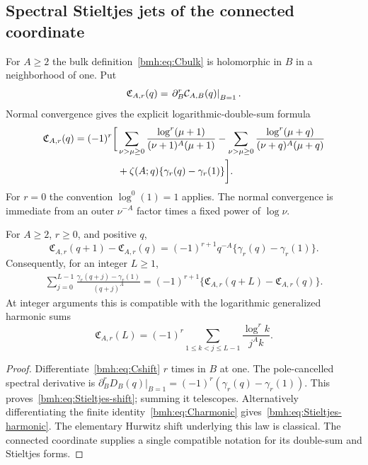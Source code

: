 \subsection{Spectral Stieltjes jets of the connected coordinate}
For $A\ge2$ the bulk definition~\eqref{bmh:eq:Cbulk} is holomorphic in
$B$ in a neighborhood of one. Put
\begin{equation}\label{bmh:eq:scriptC}
 \mathfrak C_{A,r}(q)=
 \left.\partial_B^r\mathcal C_{A,B}(q)\right|_{B=1}.
\end{equation}
Normal convergence gives the explicit logarithmic-double-sum formula
\begin{align}
 \mathfrak C_{A,r}(q)=(-1)^r\biggl[&
 \sum_{\nu>\mu\ge0}\frac{\log^r(\mu+1)}{(\nu+1)^A(\mu+1)}
 -\sum_{\nu>\mu\ge0}\frac{\log^r(\mu+q)}{(\nu+q)^A(\mu+q)}\notag\\
 &+\zeta(A;q)\{\gamma_r(q)-\gamma_r(1)\}\biggr].
 \label{bmh:eq:scriptC-series}
\end{align}
For $r=0$ the convention $\log^0(1)=1$ applies. The normal convergence
is immediate from an outer $\nu^{-A}$ factor times a fixed power of
$\log\nu$.

\begin{proposition}
\label{bmh:prop:Stieltjes-shift}
For $A\ge2$, $r\ge0$, and positive $q$,
\begin{equation}\label{bmh:eq:Stieltjes-shift}
 \mathfrak C_{A,r}(q+1)-\mathfrak C_{A,r}(q)
 =(-1)^{r+1}q^{-A}\{\gamma_r(q)-\gamma_r(1)\}.
\end{equation}
Consequently, for an integer $L\ge1$,
\begin{align}
 \sum_{j=0}^{L-1}\frac{\gamma_r(q+j)-\gamma_r(1)}{(q+j)^A}
 =(-1)^{r+1}\{
 \mathfrak C_{A,r}(q+L)-\mathfrak C_{A,r}(q)\}.
 \label{bmh:eq:Stieltjes-finite-sum}
\end{align}
At integer arguments this is compatible with the logarithmic generalized
harmonic sums
\begin{equation}\label{bmh:eq:Stieltjes-harmonic}
 \mathfrak C_{A,r}(L)=(-1)^r
 \sum_{1\le k<j\le L-1}\frac{\log^r k}{j^A k}.
\end{equation}
\end{proposition}
\begin{proof}
Differentiate~\eqref{bmh:eq:Cshift} $r$ times in $B$ at one.
The pole-cancelled spectral derivative is
$\partial_B^rD_B(q)|_{B=1}=(-1)^r(\gamma_r(q)-\gamma_r(1))$.
This proves~\eqref{bmh:eq:Stieltjes-shift}; summing it telescopes.
Alternatively differentiating the finite identity~\eqref{bmh:eq:Charmonic}
gives~\eqref{bmh:eq:Stieltjes-harmonic}. The elementary Hurwitz shift
underlying this law is classical. The connected coordinate supplies a
single compatible notation for its double-sum and Stieltjes forms.
\end{proof}

